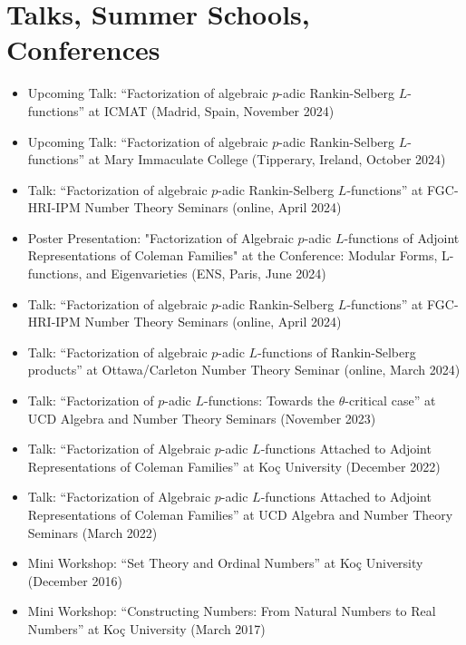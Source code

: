 \documentclass[letterpaper,11pt]{article}
\newcommand{\resumeItem}[1]{
  \item\small{
    {#1 \vspace{-2pt}}
  }
}
\newcommand{\resumeItemListStart}{\begin{itemize}}
\newcommand{\resumeItemListEnd}{\end{itemize}\vspace{-5pt}}
\begin{document}
\section{Talks, Summer Schools, Conferences}
  \resumeItemListStart
    \resumeItem {Upcoming Talk: ``Factorization of algebraic $p$-adic Rankin-Selberg $L$-functions'' at ICMAT (Madrid, Spain, November 2024)}
    \resumeItem {Upcoming Talk: ``Factorization of algebraic $p$-adic Rankin-Selberg $L$-functions'' at Mary Immaculate College (Tipperary, Ireland, October 2024)}
    \resumeItem {Talk: ``Factorization of algebraic $p$-adic Rankin-Selberg $L$-functions'' at FGC-HRI-IPM Number Theory Seminars (online, April 2024)}
    \resumeItem{Poster Presentation: "Factorization of Algebraic $p$-adic $L$-functions of Adjoint
    Representations of Coleman Families" at the Conference: Modular Forms, L-functions, and Eigenvarieties (ENS, Paris, June 2024)}
    \resumeItem {Talk: ``Factorization of algebraic $p$-adic Rankin-Selberg $L$-functions'' at FGC-HRI-IPM Number Theory Seminars (online, April 2024)}
    \resumeItem {Talk: ``Factorization of algebraic $p$-adic $L$-functions of Rankin-Selberg products'' at Ottawa/Carleton Number Theory Seminar (online, March 2024)}
    \resumeItem {Talk: ``Factorization of $p$-adic $L$-functions: Towards the $\theta$-critical case'' at UCD Algebra and Number Theory Seminars (November 2023)}
    \resumeItem {Talk: ``Factorization of Algebraic $p$-adic $L$-functions Attached to Adjoint Representations of Coleman Families'' at Koç University (December 2022)}
    \resumeItem {Talk: ``Factorization of Algebraic $p$-adic $L$-functions Attached to Adjoint Representations of Coleman Families'' at UCD Algebra and Number Theory Seminars (March 2022)}
    \resumeItem {Mini Workshop: ``Set Theory and Ordinal Numbers'' at Koç University (December 2016)}
    \resumeItem {Mini Workshop: ``Constructing Numbers: From Natural Numbers to Real Numbers'' at Koç University (March 2017)}
  \resumeItemListEnd
 \vspace{-16pt}
\end{document}
